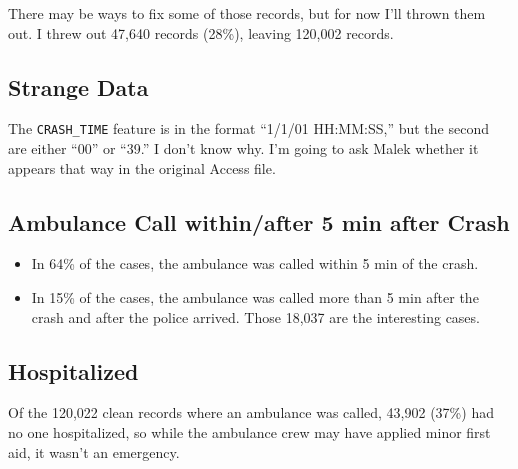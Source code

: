 There may be ways to fix some of those records, but for now I'll thrown them out.  I threw out 47,640 records (28\%), leaving 120,002 records.  

\subsection{Strange Data}

The \verb|CRASH_TIME| feature is in the format ``1/1/01 HH:MM:SS,'' but the second are either ``00'' or ``39.''  I don't know why.  I'm going to ask Malek whether it appears that way in the original Access file.  

\subsection{Ambulance Call within/after 5 min after Crash}

\begin{itemize}
	\item In 64\% of the cases, the ambulance was called within 5 min of the crash.  
	\item In 15\% of the cases, the ambulance was called more than 5 min after the crash and after the police arrived.  Those 18,037 are the interesting cases.  
\end{itemize}

\subsection{Hospitalized}

Of the 120,022 clean records where an ambulance was called, 43,902 (37\%) had no one hospitalized, so while the ambulance crew may have applied minor first aid, it wasn't an emergency.  




